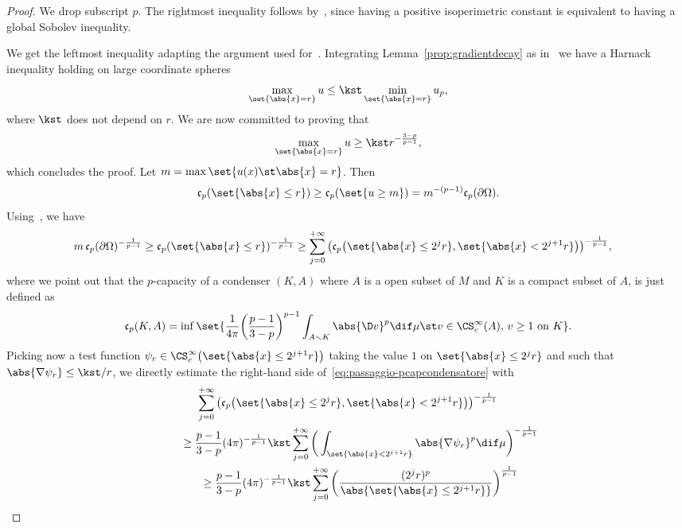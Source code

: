 \documentclass[10pt,a4paper]{amsart}
\numberwithin{equation}{section}
\renewcommand{\ncapa}{\mathfrak{c}}
\begin{document}
\begin{proof} We drop subscript $p$. The rightmost inequality follows by~\cite[Theorem 3.6]{mari_flowlaplaceapproximationnew_2022}, since having a positive isoperimetric constant is equivalent to having a global Sobolev inequality.

We get the leftmost inequality adapting the argument used for~\cite[Proposition 5.9]{holopainen_volumegrowthgreenfunctions_1999}. Integrating Lemma~\ref{prop:gradientdecay} as in~\cite{wang_localgradientestimateharmonic_2010} we have a Harnack inequality holding on large coordinate spheres
\[
\max_{\set{\abs{x} =r}} u \leq \kst \min_{\set{\abs{x} =r}} u_p,
\]
where $\kst$ does not depend on $r$. We are now committed to proving that
\[
 \max_{\set{\abs{x} =r}} u \geq \kst r^{-\frac{3-p}{p-1}},
\]
which concludes the proof. Let $m = \max\set{ u(x) \st \abs{x}=r}$. Then
\[
 \ncapa_p(\set{\abs{x} \leq r}) \geq \ncapa_p(\set{ u \geq m})= m^{-(p-1)} \ncapa_p(\partial \Omega).
\]
Using~\cite[Theorem 2.6]{heinonen_nonlinearpotentialtheorydegenerate_2018}, we have
\begin{align}
\label{eq:passaggio-pcapcondensatore}
 m\,\ncapa_p(\partial \Omega)^{-\frac{1}{p-1}} &\geq \ncapa_p(\set{\abs{x} \leq r})^{-\frac{1}{p-1}}\geq \sum_{j=0}^{+\infty} \big( \ncapa_p\big(\set{\abs{x} \leq 2^{j}r}, \set{ \abs{ x} < 2^{j+1} r}\big)\big)^{-\frac{1}{p-1}},
\end{align}
where we point out that the $p$-capacity of a condenser $(K,A)$ where $A$ is a open subset of $M$ and $K$ is a compact subset of $A$, is just defined as
\[
 \ncapa_p(K, A) = \inf \set{\frac{1}{4\pi}\bigg(\frac{p-1}{3-p}\bigg)^{p-1}\int_{A\smallsetminus K} \abs{\D v}^p \dif \mu\st v \in \CS_c^\infty(A),\, v \geq 1\text{ on } K}.
\]
Picking now a test function $\psi_r\in \CS_c^\infty\big(\set{\abs{x} \leq 2^{j+1}r}\big)$ taking the value $1$ on $\set{\abs{x} \leq 2^{j}r}$ and such that $\abs{\nabla \psi_r} \leq \kst/r$, we directly estimate the right-hand side of~\eqref{eq:passaggio-pcapcondensatore} with
\begin{gather}
 \sum_{j=0}^{+\infty} \big( \ncapa_p\big(\set{\abs{x} \leq 2^{j}r}, \set{ \abs{ x} < 2^{j+1} r}\big)\big)^{-\frac{1}{p-1}}\nonumber\\
 \qquad{}\geq\frac{p-1}{3-p}(4 \pi)^{-\frac{1}{p-1}} \kst \sum_{j=0}^{+\infty} \bigg( \int_{\set{\abs{x}< 2^{j+1}r}} \abs{\nabla \psi_r}^p\dif \mu\bigg)^{-\frac{1}{p-1}}\nonumber\\
 \qquad{}\geq\frac{p-1}{3-p}(4 \pi)^{-\frac{1}{p-1}} \kst \sum_{j=0}^{+\infty} \bigg( \frac{(2^j r)^p}{\abs{ \set{\abs{x}\leq 2^{j+1}r}}}\bigg)^{\frac{1}{p-1}}\nonumber\\

\end{gather}
\end{proof}
\end{document}
